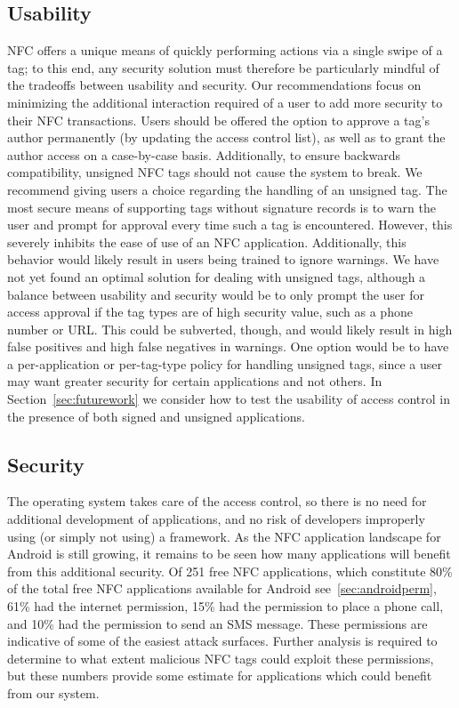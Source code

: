 \documentclass[12pt]{article}
\begin{document}
\subsection{Usability}
NFC offers a unique means of quickly performing actions via a single swipe of a tag; to this end, any security solution must therefore be particularly mindful of the tradeoffs between usability and security.
Our recommendations focus on minimizing the additional interaction required of a user to add more security to their NFC transactions.
Users should be offered the option to approve a tag's author permanently (by updating the access control list), as well as to grant the author access on a case-by-case basis.
Additionally, to ensure backwards compatibility, unsigned NFC tags should not cause the system to break.
We recommend giving users a choice regarding the handling of an unsigned tag.
The most secure means of supporting tags without signature records is to warn the user and prompt for approval every time such a tag is encountered.
However, this severely inhibits the ease of use of an NFC application.
Additionally, this behavior would likely result in users being trained to ignore warnings.
We have not yet found an optimal solution for dealing with unsigned tags, although a balance between usability and security would be to only prompt the user for access approval if the tag types are of high security value, such as a phone number or URL.
This could be subverted, though, and would likely result in high false positives and high false negatives in warnings.
One option would be to have a per-application or per-tag-type policy for handling unsigned tags, since a user may want greater security for certain applications and not others.
In Section~\ref{sec:futurework} we consider how to test the usability of access control in the presence of both signed and unsigned applications.

\subsection{Security}
The operating system takes care of the access control, so there is no need for additional development of applications, and no risk of developers improperly using (or simply not using) a framework.
As the NFC application landscape for Android is still growing, it remains to be seen how many applications will benefit from this additional security.
Of 251 free NFC applications, which constitute 80\% of the total free NFC applications available for Android see~\ref{sec:androidperm}, 61\% had the internet permission, 15\% had the permission to place a phone call, and 10\% had the permission to send an SMS message.
These permissions are indicative of some of the easiest attack surfaces.
Further analysis is required to determine to what extent malicious NFC tags could exploit these permissions, but these numbers provide some estimate for applications which could benefit from our system.
\end{document}
